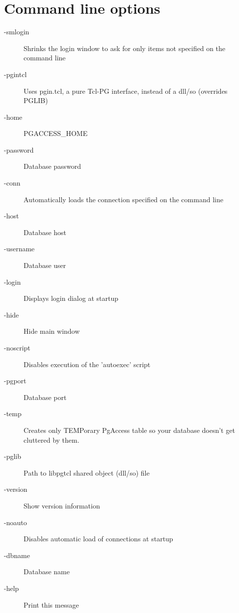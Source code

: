 \section{Command line options}
\begin{description}
    \item[-smlogin] Shrinks the login window to ask for only items not specified on the command line
    \item[-pgintcl] Uses pgin.tcl, a pure Tcl-PG interface, instead of a dll/so (overrides PGLIB)
    \item[-home] PGACCESS\_HOME
    \item[-password] Database password
    \item[-conn] Automatically loads the connection specified on the command line
    \item[-host] Database host
    \item[-username] Database user
    \item[-login] Displays login dialog at startup
    \item[-hide] Hide main window
    \item[-noscript] Disables execution of the 'autoexec' script
    \item[-pgport] Database port
    \item[-temp] Creates only TEMPorary PgAccess table so your database doesn't get cluttered by them.
    \item[-pglib] Path to libpgtcl shared object (dll/so) file
    \item[-version] Show version information
    \item[-noauto] Disables automatic load of connections at startup
    \item[-dbname] Database name
    \item[-help] Print this message
\end{description}
